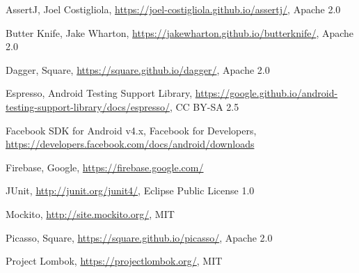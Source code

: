 \documentclass[10pt,a4paper]{article}
\begin{document}
\begin{thebibliography}{99}

		AssertJ,
		Joel Costigliola,
		\url{https://joel-costigliola.github.io/assertj/},
		Apache 2.0

		Butter Knife,
		Jake Wharton,
		\url{https://jakewharton.github.io/butterknife/},
		Apache 2.0

		Dagger,
		Square,
		\url{https://square.github.io/dagger/},
		Apache 2.0

		Espresso,
		Android Testing Support Library,
		\url{https://google.github.io/android-testing-support-library/docs/espresso/},
		CC BY-SA 2.5

		Facebook SDK for Android v4.x,
		Facebook for Developers,
		\url{https://developers.facebook.com/docs/android/downloads}

		Firebase,
		Google,
		\url{https://firebase.google.com/}

		JUnit,
		\url{http://junit.org/junit4/},
		Eclipse Public License 1.0

		Mockito,
		\url{http://site.mockito.org/},
		MIT

		Picasso,
		Square,
		\url{https://square.github.io/picasso/},
		Apache 2.0

		Project Lombok,
		\url{https://projectlombok.org/},
		MIT

\end{thebibliography}
\end{document}
